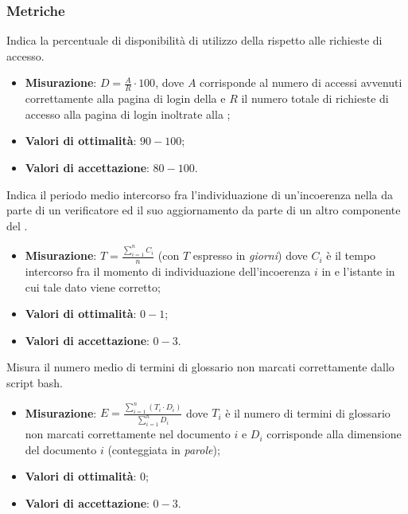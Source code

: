\subsubsection{Metriche}
\label{dispPragmaDB}
Indica la percentuale di disponibilità di utilizzo della  \pragmadb rispetto alle richieste di accesso.
\begin{itemize}
\item \textbf{Misurazione}: $ D = \frac{A}{R} \cdot 100 $, dove $A$ corrisponde al numero di accessi avvenuti correttamente alla pagina di login della  e $R$ il numero totale di richieste di accesso alla pagina di login inoltrate alla ;
\item \textbf{Valori di ottimalità}: $90 - 100$;
\item \textbf{Valori di accettazione}: $80 - 100$.
\end{itemize}
\label{tCorrIncoerPragmaDB}
Indica il periodo medio intercorso fra l'individuazione di un'incoerenza nella  \pragmadb da parte di un verificatore ed il suo aggiornamento da parte di un altro componente del .
\begin{itemize}
\item \textbf{Misurazione}: $T = \frac{\sum_{i=1}^{n} C_{i}}{n}$ (con $T$ espresso in \textit{giorni}) dove $C_{i}$ è il tempo intercorso fra il momento di individuazione dell'incoerenza $i$ in \pragmadb e l'istante in cui tale dato viene corretto;
\item \textbf{Valori di ottimalità}: $0 - 1$;
\item \textbf{Valori di accettazione}: $0 - 3$.
\end{itemize}
\label{errIndividTermGloss}
Misura il numero medio di termini di glossario non marcati correttamente dallo script bash.
\begin{itemize}
\item \textbf{Misurazione}: $E = \frac{\sum_{i=1}^{n} (T_{i} \cdot D_{i})}{\sum_{i=1}^{n} D_{i}}$ dove $T_{i}$ è il numero di termini di glossario non marcati correttamente nel documento $i$ e $D_{i}$ corrisponde alla dimensione del documento $i$ (conteggiata in \textit{parole});
\item \textbf{Valori di ottimalità}: $0$;
\item \textbf{Valori di accettazione}: $0 - 3$.
\end{itemize}
